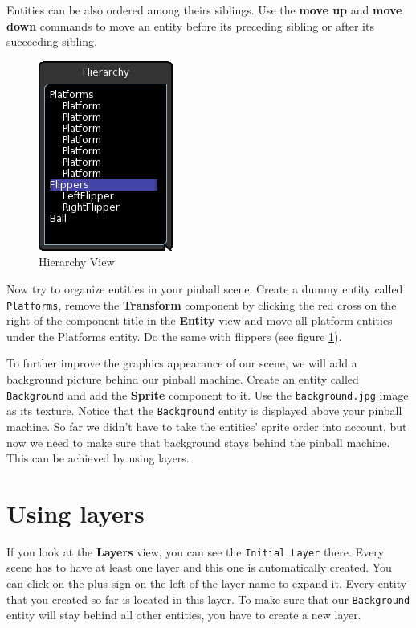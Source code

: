 \documentclass[a4paper,12pt]{article}
\begin{document}
Entities can be also ordered among theirs siblings. Use the \textbf{move up} and \textbf{move down} commands to move an entity before its preceding sibling or after its succeeding sibling.

\begin{figure}
\vspace{-20pt}
\capstart
\begin{center}
  \includegraphics[scale=0.65]{Hierarchy}
 \end{center}
 \vspace{-20pt}
 \caption{Hierarchy View}
 \label{fig:hierarchy}
 \vspace{-10pt}
\end{figure}

Now try to organize entities in your pinball scene. Create a dummy entity called \texttt{Platforms}, remove the \textbf{Transform} component by clicking the red cross on the right of the component title in the \textbf{Entity} view and move all platform entities under the Platforms entity. Do the same with flippers (see figure \ref{fig:hierarchy}).

To further improve the graphics appearance of our scene, we will add a background picture behind our pinball machine. Create an entity called \texttt{Background} and add the \textbf{Sprite} component to it. Use the \texttt{background.jpg} image as its texture. Notice that the \texttt{Background} entity is displayed above your pinball machine. So far we didn't have to take the entities' sprite order into account, but now we need to make sure that background stays behind the pinball machine. This can be achieved by using layers.  

\section{Using layers}

If you look at the \textbf{Layers} view, you can see the \texttt{Initial Layer} there. Every scene has to have at least one layer and this one is automatically created. You can click on the plus sign on the left of the layer name to expand it. Every entity that you created so far is located in this layer. To make sure that our \texttt{Background} entity will stay behind all other entities, you have to create a new layer.
\end{document}
